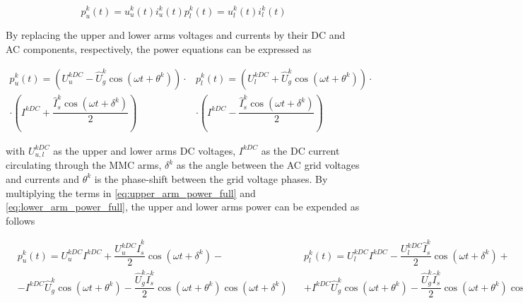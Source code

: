 \documentclass[journal]{IEEEtran}
\begin{document}
\begin{subequations}
\begin{equation}
p_u^{k}(t) = u_u^{k}(t)i_u^k(t)
\label{eq:upper_arm_power}
\end{equation}    
\begin{equation}
p_l^{k}(t) = u_l^{k}(t)i_l^k(t) 
\label{eq:lower_arm_power}
\end{equation}
\end{subequations}

By replacing the upper and lower arms voltages and currents by their DC and AC components, respectively, the power equations can be expressed as

\begin{subequations}
\begin{align}
p_u^{k}(t) = \left(U_u^{kDC} - \hat{U}_g^k \cos(\omega t + \theta^k) \right) \cdot \nonumber \\ \cdot \left(I^{kDC} + \dfrac{\hat{I}_s^k \cos(\omega t + \delta^k )}{2} \right) 
\label{eq:upper_arm_power_full}
\end{align}    
\begin{align}
p_l^{k}(t) = \left(U_l^{kDC} + \hat{U}_g^k \cos(\omega t + \theta^k) \right) \cdot \nonumber \\ \cdot \left(I^{kDC} - \dfrac{\hat{I}_s^k \cos(\omega t + \delta^k )}{2}  \right) 
\label{eq:lower_arm_power_full}
\end{align}
\end{subequations}

\noindent with $U_{u,l}^{kDC}$ as the upper and lower arms DC voltages, $I^{kDC}$ as the DC current circulating through the MMC arms, $\delta^k$ as the angle between the AC grid voltages and currents and $\theta^k$ is the phase-shift between the grid voltage phases. By multiplying the terms in \eqref{eq:upper_arm_power_full} and \eqref{eq:lower_arm_power_full}, the upper and lower arms power can be expended as follows


\begin{subequations}
\begin{align}
&p_u^{k}(t) = U_u^{kDC}I^{kDC} + \dfrac{U_u^{kDC}\hat{I}_s^k}{2} \cos(\omega t + \delta^k ) - \\ & - I^{kDC}\hat{U}_g^k \cos(\omega t + \theta^k) - \dfrac{\hat{U}_g^k \hat{I}_s^k}{2}\cos(\omega t + \theta^k) \cos(\omega t + \delta^k )\nonumber 
\label{eq:Uarm_power_comp}
\end{align}    
\begin{align}
&p_l^{k}(t) = U_l^{kDC}I^{kDC} - \dfrac{U_l^{kDC}\hat{I}_s^k}{2} \cos(\omega t + \delta^k ) + \\ & + I^{kDC}\hat{U}_g^k \cos(\omega t + \theta^k) - \dfrac{\hat{U}_g^k\hat{I}_s^k}{2}\cos(\omega t + \theta^k)\cos(\omega t + \delta^k )\nonumber
\label{eq:Larm_power_comp}
\end{align}
\end{subequations}
\end{document}
